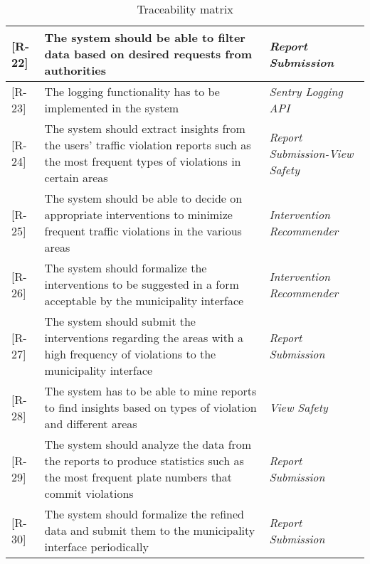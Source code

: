 \begin{table}[H]
\begin{tabulary}{\textwidth}{|J|J|J|}
 [R-22] & The system should be able to filter data based on desired requests from authorities & \emph{Report Submission} 		\\ \hline 

 [R-23] & The logging functionality has to be implemented in the system & \emph{Sentry Logging API} 		\\ \hline 

 [R-24] &  The system should extract insights from the users’ traffic violation reports such as the most frequent types of violations in certain areas & \emph{Report Submission-View Safety} 		\\ \hline 

 [R-25] & The system should be able to decide on appropriate interventions to minimize frequent traffic violations in the various areas
 & \emph{Intervention Recommender} 		\\ \hline 

 [R-26] & The system should formalize the interventions to be suggested in a form acceptable by the municipality interface & \emph{Intervention Recommender} 		\\ \hline 

 [R-27] & The system should submit the interventions regarding the areas with a high frequency of violations to the municipality interface & \emph{Report Submission} 		\\ \hline 

 [R-28] & The system has to be able to mine reports to find insights based on types of violation and different areas & \emph{View Safety} 		\\ \hline 

 [R-29] & The system should analyze the data from the reports to produce statistics such as the most frequent plate numbers that commit violations & \emph{Report Submission} 		\\ \hline 

 [R-30] & The system should formalize the refined data and submit them to the municipality interface periodically & \emph{Report Submission} 		\\ \hline 


\end{tabulary}
\caption{\label{tab:Usecase-View-Safety}Traceability matrix}
\end{table}


